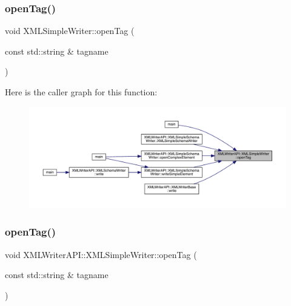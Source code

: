 \mbox{\label{classXMLWriterAPI_1_1XMLSimpleWriter_ac3033f799bbe8ba59bfba4f8c22a2e79}} 
\subsubsection{\texorpdfstring{openTag()}{openTag()}\hspace{0.1cm}{\footnotesize\ttfamily [1/12]}}
{\footnotesize\ttfamily void X\+M\+L\+Simple\+Writer\+::open\+Tag (\begin{DoxyParamCaption}\item[{const std\+::string \&}]{tagname }\end{DoxyParamCaption})}

Here is the caller graph for this function\+:
\nopagebreak
\begin{figure}[H]
\begin{center}
\leavevmode
\includegraphics[width=350pt]{d5/de1/classXMLWriterAPI_1_1XMLSimpleWriter_ac3033f799bbe8ba59bfba4f8c22a2e79_icgraph}
\end{center}
\end{figure}
\mbox{\label{classXMLWriterAPI_1_1XMLSimpleWriter_aaddd3b55ffc11672fef8ce464f2882c4}} 
\subsubsection{\texorpdfstring{openTag()}{openTag()}\hspace{0.1cm}{\footnotesize\ttfamily [2/12]}}
{\footnotesize\ttfamily void X\+M\+L\+Writer\+A\+P\+I\+::\+X\+M\+L\+Simple\+Writer\+::open\+Tag (\begin{DoxyParamCaption}\item[{const std\+::string \&}]{tagname }\end{DoxyParamCaption})}


